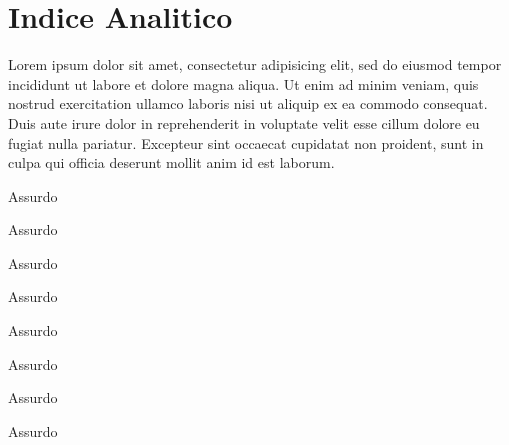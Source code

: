 \documentclass[a4paper, 12pt]{report}
\begin{document}

\newpage

\section{Indice Analitico}

Lorem ipsum dolor sit amet, consectetur adipisicing elit, sed do eiusmod
tempor incididunt ut labore et dolore magna aliqua. Ut enim ad minim veniam,
quis nostrud exercitation ullamco laboris nisi ut aliquip ex ea commodo
consequat. Duis aute irure dolor in reprehenderit in voluptate velit esse
cillum dolore eu fugiat nulla pariatur. Excepteur sint occaecat cupidatat non
proident, sunt in culpa qui officia deserunt mollit anim id est laborum.

\begin{multicols*}{2}

\makebox[3cm][l]{\absurd} Assurdo

\makebox[3cm][l]{\absurd} Assurdo

\makebox[3cm][l]{\absurd} Assurdo

\makebox[3cm][l]{\absurd} Assurdo

\vfill\null\columnbreak

\makebox[3cm][l]{\absurd} Assurdo

\makebox[3cm][l]{\absurd} Assurdo

\makebox[3cm][l]{\absurd} Assurdo

\makebox[3cm][l]{\absurd} Assurdo

\end{multicols*}
\end{document}
